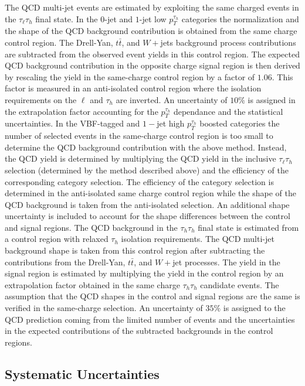 The QCD multi-jet events are estimated by exploiting the same charged events in the $\tau_{\ell}\tau_h$ final state. In the $0$-jet and $1$-jet low $p_{T}^{\tau_h}$ categories the normalization and the shape  of the QCD background contribution is obtained from the same charge control region. The Drell-Yan, $t\bar{t}$, and $W+$jets background process contributions are subtracted from the observed event yields in this control region. The expected QCD background contribution in the opposite charge signal region is then derived by rescaling the yield in the same-charge control region by a factor of $1.06$. This factor is measured in an anti-isolated control region where the isolation requirements on the $\ell$ and $\tau_h$ are inverted. An uncertainty of $10\%$ is assigned in the extrapolation factor accounting for the $p_{T}^{\tau_h}$ dependance and the statistical uncertainties. In the VBF-tagged and $1-$jet high $p_{T}^{\tau_h}$ boosted categories the number of selected events in the same-charge control region is too small to determine the QCD background contribution with the above method. Instead, the QCD yield is determined by multiplying the QCD yield in the inclusive $\tau_{\ell}\tau_h$ selection (determined by the method described above) and the efficiency of the corresponding category selection. The efficiency of the category selection is determined in the anti-isolated same charge control region while  the shape of the QCD background is taken from the anti-isolated selection. An additional shape uncertainty is included to account for the shape differences between the control and signal regions. The QCD background in the $\tau_h\tau_h$ final state is estimated from a control region with relaxed $\tau_h$ isolation requirements. The QCD multi-jet background shape is taken from this control region after subtracting the contributions from the Drell-Yan, $t\bar{t}$, and $W+$jet processes. The yield in the signal region is estimated by multiplying the yield in the control region by an extrapolation factor obtained in the same charge $\tau_h\tau_h$ candidate events. The assumption that the QCD shapes in the control and signal regions are the same is verified in the same-charge selection.  An uncertainty of $35\%$ is assigned to the QCD prediction coming from the limited number of events and the uncertainties in the expected contributions of the subtracted backgrounds in the control regions.   

\subsection{Systematic Uncertainties}

